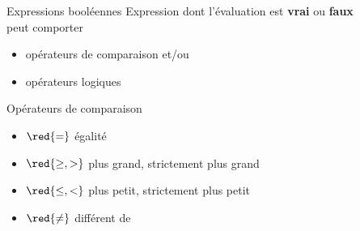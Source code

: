  \begin{frame}{Expressions booléennes}
   Expression dont l'évaluation est \textbf{vrai} ou \textbf{faux} \\
   peut comporter
   \begin{itemize}
   \item opérateurs de comparaison et/ou
   \item opérateurs logiques
   \end{itemize}
 \end{frame}

 \begin{frame}{Opérateurs de comparaison}
   \begin{itemize}
   \item ${\red{\mathbf{=}}}$ égalité
   \item ${\red{\mathbf{\geq,>}}}$ plus grand, strictement plus grand
   \item ${\red{\mathbf{\leq,<}}}$ plus petit, strictement plus petit
   \item ${\red{\mathbf{\neq}}}$   différent de 
   \end{itemize}
~\\
 \end{frame}

